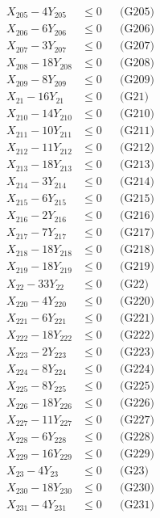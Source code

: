 \documentclass[a4paper,10pt]{article}
\begin{document}
{\begin{align}
X_{205} - 4Y_{205} &\leq 0 && \text{(G205)} \\
\allowbreak
X_{206} - 6Y_{206} &\leq 0 && \text{(G206)} \\
X_{207} - 3Y_{207} &\leq 0 && \text{(G207)} \\
X_{208} - 18Y_{208} &\leq 0 && \text{(G208)} \\
X_{209} - 8Y_{209} &\leq 0 && \text{(G209)} \\
X_{21} - 16Y_{21} &\leq 0 && \text{(G21)} \\
X_{210} - 14Y_{210} &\leq 0 && \text{(G210)} \\
X_{211} - 10Y_{211} &\leq 0 && \text{(G211)} \\
X_{212} - 11Y_{212} &\leq 0 && \text{(G212)} \\
X_{213} - 18Y_{213} &\leq 0 && \text{(G213)} \\
X_{214} - 3Y_{214} &\leq 0 && \text{(G214)} \\
X_{215} - 6Y_{215} &\leq 0 && \text{(G215)} \\
X_{216} - 2Y_{216} &\leq 0 && \text{(G216)} \\
X_{217} - 7Y_{217} &\leq 0 && \text{(G217)} \\
X_{218} - 18Y_{218} &\leq 0 && \text{(G218)} \\
X_{219} - 18Y_{219} &\leq 0 && \text{(G219)} \\
X_{22} - 33Y_{22} &\leq 0 && \text{(G22)} \\
X_{220} - 4Y_{220} &\leq 0 && \text{(G220)} \\
X_{221} - 6Y_{221} &\leq 0 && \text{(G221)} \\
X_{222} - 18Y_{222} &\leq 0 && \text{(G222)} \\
X_{223} - 2Y_{223} &\leq 0 && \text{(G223)} \\
\allowbreak
X_{224} - 8Y_{224} &\leq 0 && \text{(G224)} \\
X_{225} - 8Y_{225} &\leq 0 && \text{(G225)} \\
X_{226} - 18Y_{226} &\leq 0 && \text{(G226)} \\
X_{227} - 11Y_{227} &\leq 0 && \text{(G227)} \\
X_{228} - 6Y_{228} &\leq 0 && \text{(G228)} \\
X_{229} - 16Y_{229} &\leq 0 && \text{(G229)} \\
X_{23} - 4Y_{23} &\leq 0 && \text{(G23)} \\
X_{230} - 18Y_{230} &\leq 0 && \text{(G230)} \\
X_{231} - 4Y_{231} &\leq 0 && \text{(G231)} \\

\end{align}}
\end{document}
